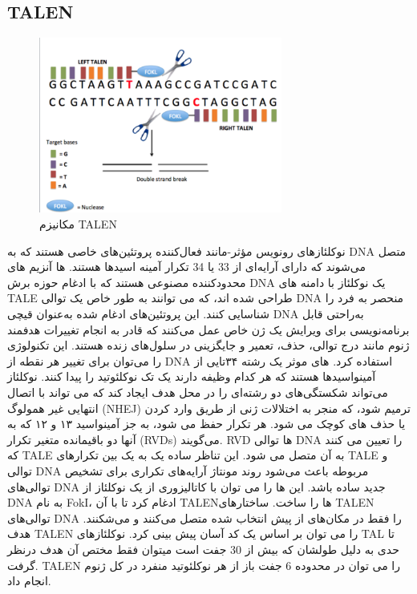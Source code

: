 \documentclass[12pt,a4paper,BCOR=.7cm,headsepline,bibliography=totoc]{report}
\begin{document}
\subsection{TALEN}
\begin{figure}
\centering
\includegraphics[width=8cm, ]{pictures/Overview_of_TALENs.png}
\caption{
مکانیزم TALEN
}\label{wrap-fig:4}
\end{figure}
نوکلئازهای رونویس مؤثر-مانند فعال‌کننده
 پروتئین‌های خاصی هستند که به DNA متصل می‌شوند که دارای آرایه‌ای از 33 یا 34 تکرار  آمینه اسیدها هستند. 
ها آنزیم های محدودکننده مصنوعی هستند که با ادغام حوزه برش DNA یک نوکلئاز با دامنه های TALE طراحی شده اند، که می توانند به طور خاص یک توالی DNA منحصر به فرد را شناسایی کنند. این پروتئین‌های ادغام شده به‌عنوان قیچی DNA به‌راحتی قابل برنامه‌نویسی برای ویرایش یک ژن خاص عمل می‌کنند که قادر به انجام تغییرات هدفمند ژنوم مانند درج توالی، حذف، تعمیر و جایگزینی در سلول‌های زنده هستند. این تکنولوژی را می‌توان برای تغییر هر نقطه از DNA استفاده کرد.
 های
 موثر یک رشته ۳۴تایی از آمینو‌اسید‌ها هستند که هر کدام وظیفه دارند یک تک نوکلئوتید را پیدا کنند. نوکلئاز می‌تواند شکستگی‌های دو رشته‌ای را در محل هدف ایجاد کند که می تواند با اتصال انتهایی غیر همولوگ (NHEJ) ترمیم شود، که منجر به اختلالات ژنی از طریق وارد کردن یا حذف های کوچک می شود. هر تکرار حفظ می شود، به جز آمینواسید ۱۳ و ۱۲ که به آنها دو باقیمانده متغیر تکرار (RVDs) می‌گویند. RVD ها توالی DNA را تعیین می کنند که TALE به آن متصل می شود. این تناظر ساده یک به یک بین تکرارهای TALE و توالی DNA مربوطه باعث می‌شود روند مونتاژ آرایه‌های تکراری برای تشخیص توالی‌های DNA جدید ساده باشد. این 
ها
 را می توان با کاتالیزوری از یک نوکلئاز از DNA به نام FokI، ادغام کرد تا با آن TALENها را ساخت. ساختارهای TALEN توالی‌های DNA را فقط در مکان‌های از پیش انتخاب شده متصل می‌کنند و می‌شکنند. هدف TALEN را می توان بر اساس یک کد آسان پیش بینی کرد. نوکلئازهای TAL تا حدی به دلیل طولشان که بیش از 30 جفت است میتوان فقط مختص آن هدف درنظر گرفت. TALEN را می توان در محدوده 6 جفت باز از هر نوکلئوتید منفرد در کل ژنوم انجام داد.
\end{document}
